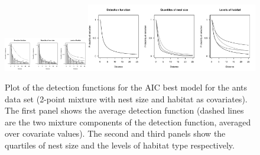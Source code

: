 \documentclass[10pt]{article}
\begin{document}
\begin{figure}[H]
\centering
\includegraphics[width=0.3333\textwidth, trim=0 0 5.73228347in 0, clip=true]{analyses/ants-nesthab-1.pdf}\includegraphics[width=0.6666\textwidth, trim=2.86614173in 0 0 0, clip=true]{analyses/ants-nesthab-2.pdf}
\caption{Plot of the detection functions for the AIC best model for the ants data set (2-point mixture with nest size and habitat as covariates). The first panel shows the average detection function (dashed lines are the two mixture components of the detection function, averaged over covariate values). The second and third panels show the quartiles of nest size and the levels of habitat type respectively.}
\label{ants-nesthab}
\end{figure}
\end{document}
